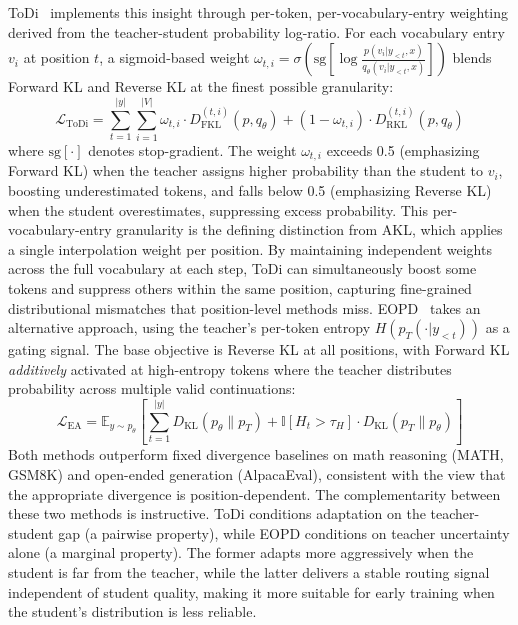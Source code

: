 \documentclass{article} %
\newcommand{\E}{\mathbb{E}}
\newcommand{\KL}{D_{\mathrm{KL}}}
\newcommand{\ptheta}{p_\theta}
\newcommand{\pteacher}{p_T}
\newcommand{\loss}{\mathcal{L}}
\begin{document}
ToDi~\citep{2505.16297} implements this insight through per-token, per-vocabulary-entry weighting derived from the teacher-student probability log-ratio. For each vocabulary entry $v_i$ at position $t$, a sigmoid-based weight $\omega_{t,i} = \sigma\!\left(\mathrm{sg}\!\left[\log \frac{p(v_i|y_{<t},x)}{q_\theta(v_i|y_{<t},x)}\right]\right)$ blends Forward KL and Reverse KL at the finest possible granularity:
\begin{equation}
    \loss_{\text{ToDi}} = \sum_{t=1}^{|y|} \sum_{i=1}^{|V|} \omega_{t,i} \cdot D_{\text{FKL}}^{(t,i)}(p, q_\theta) + (1 - \omega_{t,i}) \cdot D_{\text{RKL}}^{(t,i)}(p, q_\theta)
\end{equation}
where $\mathrm{sg}[\cdot]$ denotes stop-gradient. The weight $\omega_{t,i}$ exceeds 0.5 (emphasizing Forward KL) when the teacher assigns higher probability than the student to $v_i$, boosting underestimated tokens, and falls below 0.5 (emphasizing Reverse KL) when the student overestimates, suppressing excess probability. This per-vocabulary-entry granularity is the defining distinction from AKL, which applies a single interpolation weight per position. By maintaining independent weights across the full vocabulary at each step, ToDi can simultaneously boost some tokens and suppress others within the same position, capturing fine-grained distributional mismatches that position-level methods miss. EOPD~\citep{2603.07079} takes an alternative approach, using the teacher's per-token entropy $H(\pteacher(\cdot|y_{<t}))$ as a gating signal. The base objective is Reverse KL at all positions, with Forward KL \emph{additively} activated at high-entropy tokens where the teacher distributes probability across multiple valid continuations:
\begin{equation}
    \loss_{\text{EA}} = \E_{y \sim \ptheta} \left[ \sum_{t=1}^{|y|} \KL(\ptheta \parallel \pteacher) + \mathbb{I}[H_t > \tau_H] \cdot \KL(\pteacher \parallel \ptheta) \right]
\end{equation}
Both methods outperform fixed divergence baselines on math reasoning (MATH, GSM8K) and open-ended generation (AlpacaEval), consistent with the view that the appropriate divergence is position-dependent. The complementarity between these two methods is instructive. ToDi conditions adaptation on the teacher-student gap (a pairwise property), while EOPD conditions on teacher uncertainty alone (a marginal property). The former adapts more aggressively when the student is far from the teacher, while the latter delivers a stable routing signal independent of student quality, making it more suitable for early training when the student's distribution is less reliable.
\end{document}
